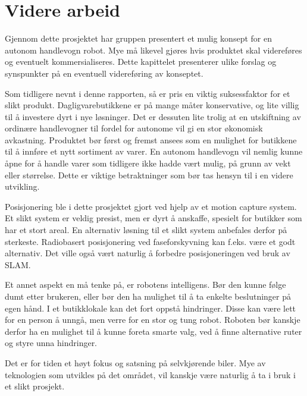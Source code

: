 
\chapter{Videre arbeid} %

\label{ch:viderearbeid} %


Gjennom dette prosjektet har gruppen presentert et mulig konsept for en autonom handlevogn robot. Mye må likevel gjøres hvis produktet skal videreføres og eventuelt kommersialiseres. Dette kapittelet presenterer ulike forslag og synspunkter på en eventuell videreføring av konseptet.

Som tidligere nevnt i denne rapporten, så er pris en viktig suksessfaktor for et slikt produkt. Dagligvarebutikkene er på mange måter konservative, og lite villig til å investere dyrt i nye løsninger. Det er dessuten lite trolig at en utskiftning av ordinære handlevogner til fordel for autonome vil gi en stor økonomisk avkastning. Produktet bør først og fremst ansees som en mulighet for butikkene til å innføre et nytt sortiment av varer. En autonom handlevogn vil nemlig kunne åpne for å handle varer som tidligere ikke hadde vært mulig, på grunn av vekt eller størrelse. Dette er viktige betraktninger som bør tas hensyn til i en videre utvikling.

Posisjonering ble i dette prosjektet gjort ved hjelp av et motion capture system. Et slikt system er veldig presist, men er dyrt å anskaffe, spesielt for butikker som har et stort areal. En alternativ løsning til et slikt system anbefales derfor på sterkeste. Radiobasert posisjonering ved faseforskyvning kan f.eks. være et godt alternativ. Det ville også vært naturlig å forbedre posisjoneringen ved bruk av SLAM.

Et annet aspekt en må tenke på, er robotens intelligens. Bør den kunne følge dumt etter brukeren, eller bør den ha mulighet til å ta enkelte beslutninger på egen hånd. I et butikklokale kan det fort oppstå hindringer. Disse kan være lett for en person å unngå, men verre for en stor og tung robot. Roboten bør kanskje derfor ha en mulighet til å kunne foreta smarte valg, ved å finne alternative ruter og styre unna hindringer.

Det er for tiden et høyt fokus og satsning på selvkjørende biler. Mye av teknologien som utvikles på det området, vil kanskje være naturlig å ta i bruk i et slikt prosjekt.